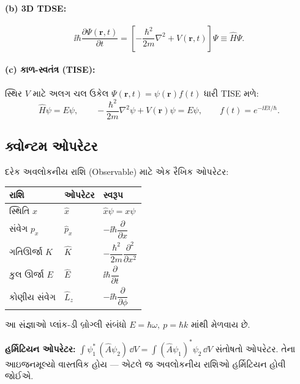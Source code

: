 \paragraph{(b) 3D TDSE:}
\begin{equation}
\ii\hbar\frac{\partial\Psi(\mathbf{r},t)}{\partial t}
=\left[-\frac{\hbar^{2}}{2m}\nabla^{2}+V(\mathbf{r},t)\right]\Psi\equiv\hat H\Psi .
\label{eq:tdse3d}
\end{equation}

\paragraph{(c) કાળ-સ્વતંત્ર (TISE):} સ્થિર $V$ માટે અલગ ચલ ઉકેલ $\Psi(\mathbf{r},t)=\psi(\mathbf{r})f(t)$ ધારી TISE મળે:
\begin{equation}
\hat H\psi=E\psi,\qquad
-\frac{\hbar^{2}}{2m}\nabla^{2}\psi+V(\mathbf{r})\psi=E\psi ,
\qquad f(t)=e^{-\ii Et/\hbar}.
\label{eq:tise}
\end{equation}

\subsection{ક્વોન્ટમ ઓપરેટર }
દરેક અવલોકનીય રાશિ (Observable) માટે એક રૈખિક ઓપરેટર:
\begin{center}
\begin{tabular}{@{}lll@{}}
\toprule
રાશિ & ઓપરેટર & સ્વરૂપ \\
\midrule
સ્થિતિ $x$ & $\hat x$ & $\hat x\psi=x\psi$ \\
સંવેગ $p_x$ & $\hat p_x$ & $-\ii\hbar\dfrac{\partial}{\partial x}$ \\
ગતિઊર્જા $K$ & $\hat K$ & $-\dfrac{\hbar^{2}}{2m}\dfrac{\partial^{2}}{\partial x^{2}}$ \\
કુલ ઊર્જા $E$ & $\hat E$ & $\ii\hbar\dfrac{\partial}{\partial t}$ \\
કોણીય સંવેગ & $\hat L_z$ & $-\ii\hbar\dfrac{\partial}{\partial\phi}$ \\
\bottomrule
\end{tabular}
\end{center}
આ સંજ્ઞાઓ પ્લાંક-ડી બ્રોગ્લી સંબંધો $E=\hbar\omega,\ p=\hbar k$ માંથી મેળવાય છે.

\begin{vayakhya}
\textbf{હર્મિટિયન ઓપરેટર:} $\displaystyle\int\psi_1^{*}\,(\hat A\psi_2)\,\dd V
=\int(\hat A\psi_1)^{*}\psi_2\,\dd V$ સંતોષતો ઓપરેટર. તેના આઇજનમૂલ્યો વાસ્તવિક હોય — એટલે જ અવલોકનીય રાશિઓ હર્મિટિયન હોવી જોઈએ.
\end{vayakhya}


